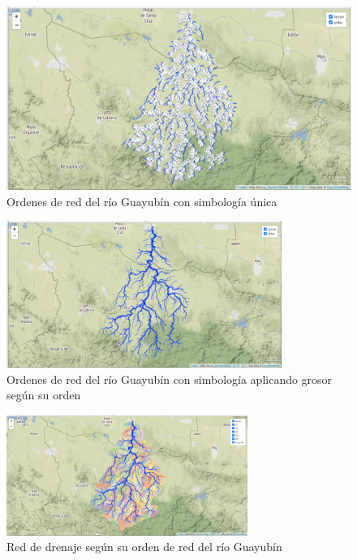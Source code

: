 \documentclass[11pt,]{article}
\begin{document}
\begin{figure}
\centering
\includegraphics[width=1.00000\textwidth]{ordenes de red.png}
\caption{Ordenes de red del río Guayubín con simbología
única\label{unica}}
\end{figure}

\begin{figure}
\centering
\includegraphics[width=0.80000\textwidth]{orden de red mapa 2.png}
\caption{Ordenes de red del río Guayubín con simbología aplicando grosor
según su orden\label{grosor}}
\end{figure}

\begin{figure}
\centering
\includegraphics[width=0.70000\textwidth]{cuencas delimitadas y ordenes de red.png}
\caption{Red de drenaje según su orden de red del río
Guayubín\label{subcuencas}}
\end{figure}
\end{document}
